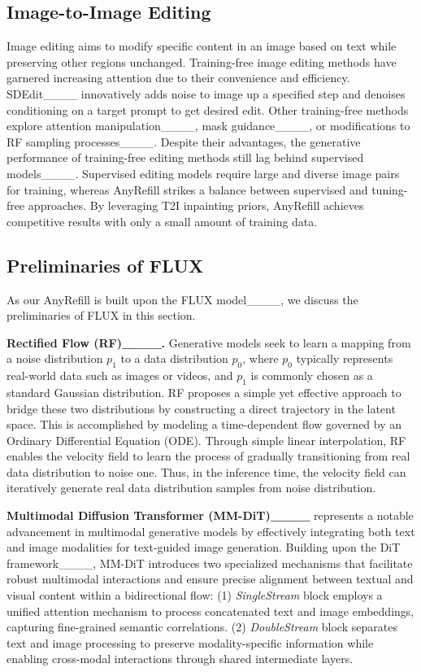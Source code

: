 \subsection{Image-to-Image Editing}
Image editing aims to modify specific content in an image based on text while preserving other regions unchanged. Training-free image editing methods have garnered increasing attention due to their convenience and efficiency. SDEdit____ innovatively adds noise to image up a specified step and denoises conditioning on a target prompt to get desired edit. Other training-free methods explore attention manipulation____, mask guidance____, or modifications to RF sampling processes____. Despite their advantages, the generative performance of training-free editing methods still lag behind supervised models____. Supervised editing models require large and diverse image pairs for training, whereas AnyRefill strikes a balance between supervised and tuning-free approaches. By leveraging T2I inpainting priors, AnyRefill achieves competitive results with only a small amount of training data.

\subsection{Preliminaries of FLUX}
\label{sec:preliminary_anyrefill}

As our AnyRefill is built upon the FLUX model____, we discuss the preliminaries of FLUX in this section.

\noindent\textbf{Rectified Flow (RF)____.}
Generative models seek to learn a mapping from a noise distribution \( p_1 \) to a data distribution \( p_0 \), where \( p_0 \) typically represents real-world data such as images or videos, and \( p_1 \) is commonly chosen as a standard Gaussian distribution. RF proposes a simple yet effective approach to bridge these two distributions by constructing a direct trajectory in the latent space. This is accomplished by modeling a time-dependent flow governed by an Ordinary Differential Equation (ODE). Through simple linear interpolation, RF enables the velocity field to learn the process of gradually transitioning from real data distribution to noise one. Thus, in the inference time, the velocity field can iteratively generate real data distribution samples from noise distribution.


\noindent\textbf{Multimodal Diffusion Transformer (MM-DiT)____}
represents a notable advancement in multimodal generative models by effectively integrating both text and image modalities for text-guided image generation. 
Building upon the DiT framework____, MM-DiT introduces two specialized mechanisms that facilitate robust multimodal interactions and ensure precise alignment between textual and visual content within a bidirectional flow: (1) \textit{SingleStream} block employs a unified attention mechanism to process concatenated text and image embeddings, capturing fine-grained semantic correlations. (2) \textit{DoubleStream} block separates text and image processing to preserve modality-specific information while enabling cross-modal interactions through shared intermediate layers.


